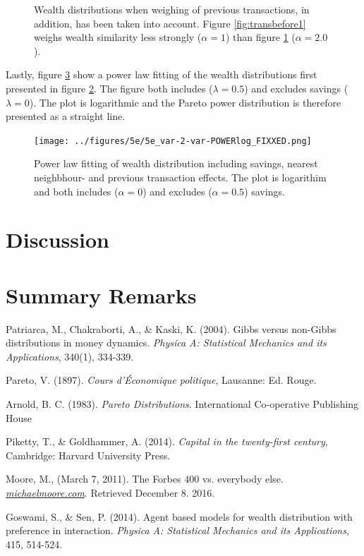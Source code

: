 \documentclass[10pt, a4paper]{amsart}
\begin{document}
\begin{figure}
\begin{subfigure}{.49\textwidth}
	\caption{}
	\label{fig:transbefore2}
\end{subfigure}
\caption{Wealth distributions when weighing of previous transactions, in addition, has been taken into account. Figure \ref{fig:transbefore1} weighs wealth similarity less strongly ($\alpha=1$) than figure \ref{fig:transbefore2} ($\alpha=2.0$).}
\label{fig:transbefore}
\end{figure}

Lastly, figure \ref{fig:transbeforefit} show a power law fitting of the wealth distributions first presented in figure \ref{fig:transbefore}. The figure both includes ($\lambda=0.5$) and excludes savings ($\lambda=0$). The plot is logarithmic and the Pareto power distribution is therefore presented as a straight line. 

\begin{figure}
	\centering
	\texttt{[image: ../figures/5e/5e\_var-2-var-POWERlog\_FIXXED.png]}
	\caption{Power law fitting of wealth distribution including savings, nearest neighbhour- and previous transaction effects. The plot is logarithim and both includes ($\alpha=0$) and excludes ($\alpha=0.5$) savings.}
	\label{fig:transbeforefit}
\end{figure}

\section{Discussion}

\section{Summary Remarks}


\begin{thebibliography}{10}

 Patriarca, M., Chakraborti, A., \& Kaski, K. (2004). 
	Gibbs versus non-Gibbs distributions in money dynamics. 
	\emph{Physica A: Statistical Mechanics and its Applications},
	340(1), 334-339.
	
 Pareto, V. (1897).
	\emph{Cours d'Économique politique},
	Lausanne: Ed. Rouge.

 Arnold, B. C. (1983). 
	\emph{Pareto Distributions}.
	 International Co-operative Publishing House	

 Piketty, T., \& Goldhammer, A. (2014).
	\emph{Capital in the twenty-first century},
	Cambridge: Harvard University Press.
	
 Moore, M., (March 7, 2011).
	The Forbes 400 vs. everybody else.
	\emph{\href{https://web.archive.org/web/20110309211959/http://www.michaelmoore.com/words/must-read/forbes-400-vs-everybody-else}{michaelmoore.com}}.
	Retrieved December 8. 2016.

 Goswami, S., \& Sen, P. (2014).
	Agent based models for wealth distribution with preference in interaction.
	\emph{Physica A: Statistical Mechanics and its Applications},
	415, 514-524.

\end{thebibliography}
\end{document}
